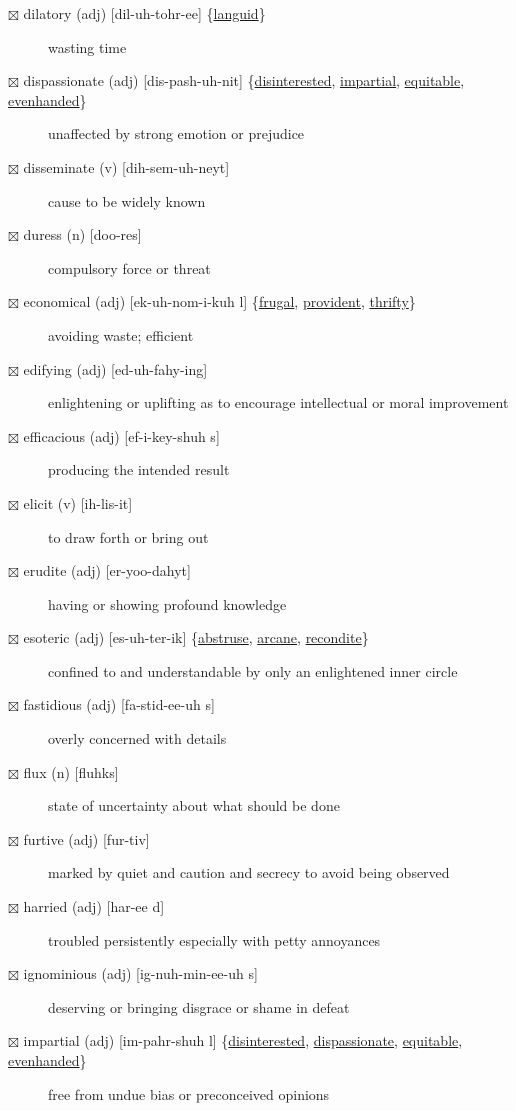 \documentclass[11pt]{article}
\begin{document}
\begin{description}
\item[{$\boxtimes$ \label{org6e0082d}dilatory (adj) [dil-uh-tohr-ee] \{\hyperref[org0ddf18a]{languid}\}}] wasting time
\item[{$\boxtimes$ \label{org49e3d5e}dispassionate (adj) [dis-pash-uh-nit] \{\hyperref[org12598d9]{disinterested}, \hyperref[orgce681fa]{impartial}, \hyperref[org7398f3e]{equitable}, \hyperref[org142d9b2]{evenhanded}\}}] unaffected by strong emotion or prejudice
\item[{$\boxtimes$ disseminate (v) [dih-sem-uh-neyt]}] cause to be widely known
\item[{$\boxtimes$ duress (n) [doo-res]}] compulsory force or threat
\item[{$\boxtimes$ \label{orgcae06d1}economical (adj) [ek-uh-nom-i-kuh l] \{\hyperref[org0d99c47]{frugal}, \hyperref[org6590548]{provident}, \hyperref[org7c1d566]{thrifty}\}}] avoiding waste; efficient
\item[{$\boxtimes$ edifying (adj) [ed-uh-fahy-ing]}] enlightening or uplifting as to encourage intellectual or moral improvement
\item[{$\boxtimes$ efficacious (adj) [ef-i-key-shuh s]}] producing the intended result
\item[{$\boxtimes$ elicit (v) [ih-lis-it]}] to draw forth or bring out
\item[{$\boxtimes$ erudite (adj) [er-yoo-dahyt]}] having or showing profound knowledge
\item[{$\boxtimes$ \label{orga87f059}esoteric (adj) [es-uh-ter-ik] \{\hyperref[org6ddbcd3]{abstruse}, \hyperref[org41835e1]{arcane}, \hyperref[org7a770d8]{recondite}\}}] confined to and understandable by only an enlightened inner circle
\item[{$\boxtimes$ fastidious (adj) [fa-stid-ee-uh s]}] overly concerned with details
\item[{$\boxtimes$ flux (n) [fluhks]}] state of uncertainty about what should be done
\item[{$\boxtimes$ furtive (adj) [fur-tiv]}] marked by quiet and caution and secrecy to avoid being observed
\item[{$\boxtimes$ harried (adj) [har-ee d]}] troubled persistently especially with petty annoyances
\item[{$\boxtimes$ ignominious (adj) [ig-nuh-min-ee-uh s]}] deserving or bringing disgrace or shame in defeat
\item[{$\boxtimes$ \label{orgce681fa}impartial (adj) [im-pahr-shuh l] \{\hyperref[org12598d9]{disinterested}, \hyperref[org49e3d5e]{dispassionate}, \hyperref[org7398f3e]{equitable}, \hyperref[org142d9b2]{evenhanded}\}}] free from undue bias or preconceived opinions

\end{description}
\end{document}
